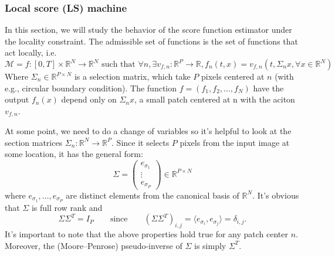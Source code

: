 \documentclass[a4paper,10pt]{article}
\theoremstyle{definition} %
\theoremstyle{definition} %
\theoremstyle{definition} %
\theoremstyle{definition} %
\newcommand{\R}{\mathbb{R}}
\newcommand{\0}{\boldsymbol{0}}
\begin{document}
\subsubsection{Local score (LS) machine}
In this section, we will study the behavior of the score function estimator under the locality constraint.
The admissible set of functions is the set of functions that act locally, i.e. 
\begin{equation*}
    \mathcal{M} = {f:[0,T]\times\R^N \rightarrow \R^N \text{ such that } \forall n, \exists v_{f,n} : \R^P \rightarrow \R, f_n(t,x)=v_{f,n}(t,\Sigma_n x, \forall x\in \R^N)}
\end{equation*}
Where $\Sigma_n \in \R^{P\times N}$ is a selection matrix, which take $P$ pixels centered at $n$ (with e.g., circular boundary condition). The function $f = (f_1,f_2,\dots,f_N)$ have the output $f_n(x)$ depend only on $\Sigma_n x$, a small patch centered at n with the aciton $v_{f,n}$.

At some point, we need to do a change of variables so it's helpful to look at the section matrices 
$\Sigma_n : \mathbb{R}^N \rightarrow \mathbb{R}^P$. 
Since it selects $P$ pixels from the input image at some location, it has the general form:
\[
\Sigma = 
\begin{pmatrix}
e_{\sigma_1} \\
\vdots \\
e_{\sigma_P}
\end{pmatrix}
\in \mathbb{R}^{P \times N}
\]
where $e_{\sigma_1}, \ldots, e_{\sigma_P}$ are distinct elements from the canonical basis of $\mathbb{R}^N$. 
It's obvious that $\Sigma$ is full row rank and
\[
\Sigma \Sigma^T = I_P \qquad \text{since} \qquad (\Sigma \Sigma^T)_{i,j} = \langle e_{\sigma_i}, e_{\sigma_j} \rangle = \delta_{i,j}.
\]
It's important to note that the above properties hold true for any patch center $n$. 
Moreover, the (Moore–Penrose) pseudo-inverse of $\Sigma$ is simply $\Sigma^T$.
\end{document}

